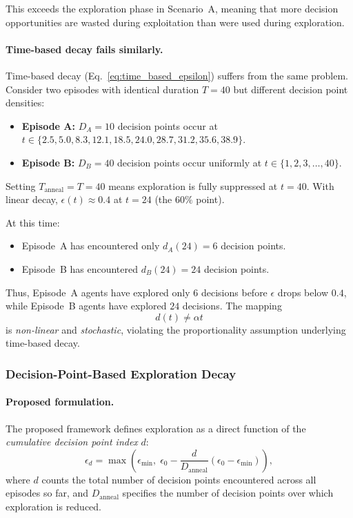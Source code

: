 This exceeds the exploration phase in Scenario~A, meaning that more decision
opportunities are wasted during exploitation than were used during exploration.

\paragraph{Time-based decay fails similarly.}
Time-based decay (Eq.~\ref{eq:time_based_epsilon}) suffers from the same problem.
Consider two episodes with identical duration $T=40$ but different decision point
densities:

\begin{itemize}
\item \textbf{Episode A:} $D_A=10$ decision points occur at
$t \in \{2.5, 5.0, 8.3, 12.1, 18.5, 24.0, 28.7, 31.2, 35.6, 38.9\}$.

\item \textbf{Episode B:} $D_B=40$ decision points occur uniformly at
$t \in \{1, 2, 3, \ldots, 40\}$.
\end{itemize}

Setting $T_{\mathrm{anneal}}=T=40$ means exploration is fully suppressed at
$t=40$. With linear decay, $\epsilon(t) \approx 0.4$ at $t=24$ (the $60\%$ point).

At this time:
\begin{itemize}
\item Episode~A has encountered only $d_A(24)=6$ decision points.
\item Episode~B has encountered $d_B(24)=24$ decision points.
\end{itemize}

Thus, Episode~A agents have explored only $6$ decisions before $\epsilon$ drops
below $0.4$, while Episode~B agents have explored $24$ decisions. The mapping
\begin{equation}
d(t) \neq \alpha t
\label{eq:decision_time_mismatch}
\end{equation}
is \emph{non-linear} and \emph{stochastic}, violating the proportionality
assumption underlying time-based decay.

\subsubsection{Decision-Point-Based Exploration Decay}

\paragraph{Proposed formulation.}
The proposed framework defines exploration as a direct function of the
\emph{cumulative decision point index} $d$:
\begin{equation}
\epsilon_d
=
\max\!\left(
\epsilon_{\min},
\;
\epsilon_0 - \frac{d}{D_{\mathrm{anneal}}}
(\epsilon_0 - \epsilon_{\min})
\right),
\label{eq:decision_based_epsilon}
\end{equation}
where $d$ counts the total number of decision points encountered across all
episodes so far, and $D_{\mathrm{anneal}}$ specifies the number of decision points
over which exploration is reduced.

